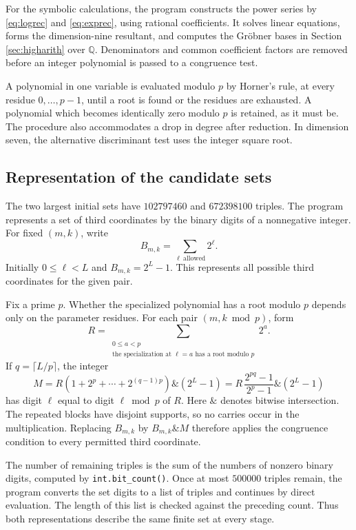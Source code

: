 \documentclass[11pt,reqno,letterpaper]{amsart}
\newcommand{\Q}{\mathbb Q}
\theoremstyle{definition}
\numberwithin{equation}{section}
\begin{document}
For the symbolic calculations, the program constructs the power series
by \eqref{eq:logrec} and \eqref{eq:exprec}, using rational coefficients.
It solves linear equations, forms the dimension-nine resultant, and
computes the Gr\"obner bases in Section \ref{sec:higharith} over $\Q$.
Denominators and common coefficient factors are removed before an
integer polynomial is passed to a congruence test.

A polynomial in one variable is evaluated modulo $p$ by Horner's rule,
at every residue $0,\ldots,p-1$, until a root is found or the residues
are exhausted. A polynomial which becomes identically zero modulo $p$
is retained, as it must be. The procedure also accommodates a drop in
degree after reduction. In dimension seven, the alternative
discriminant test uses the integer square root.

\subsection{Representation of the candidate sets}

The two largest initial sets have $102797460$ and $672398100$ triples.
The program represents a set of third coordinates by the binary digits
of a nonnegative integer. For fixed $(m,k)$, write
\[
 B_{m,k}=\sum_{\ell\ \mathrm{allowed}}2^\ell.
\]
Initially $0\le\ell<L$ and $B_{m,k}=2^L-1$. This represents all
possible third coordinates for the given pair.

Fix a prime $p$. Whether the specialized polynomial has a root modulo
$p$ depends only on the parameter residues. For each pair
$(m,k\bmod p)$, form
\[
 R=\sum_{\substack{0\le a<p\\
 \text{the specialization at }\ell=a\text{ has a root modulo }p}}2^a.
\]
If $q=\lceil L/p\rceil$, the integer
\[
 M=R\left(1+2^p+\cdots+2^{(q-1)p}\right)
       \mathbin{\&}(2^L-1)
  =R\,\frac{2^{pq}-1}{2^p-1}\mathbin{\&}(2^L-1)
\]
has digit $\ell$ equal to digit $\ell\bmod p$ of $R$. Here $\&$
denotes bitwise intersection. The repeated blocks have disjoint
supports, so no carries occur in the multiplication. Replacing
$B_{m,k}$ by $B_{m,k}\mathbin{\&}M$ therefore applies the congruence
condition to every permitted third coordinate.

The number of remaining triples is the sum of the numbers of nonzero
binary digits, computed by \nolinkurl{int.bit_count()}. Once at most
$500000$ triples remain, the program converts the set digits to a list
of triples and continues by direct evaluation. The length of this list
is checked against the preceding count. Thus both representations
describe the same finite set at every stage.
\end{document}
